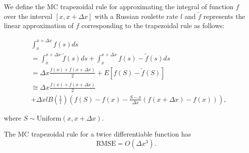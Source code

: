 \documentclass[a4paper,12pt]{article}
\begin{document}
\begin{definition}
  We define the MC trapezoidal rule for approximating the integral
  of function $f$ over the interval $[x, x+\Delta x]$ with a Russian roulette rate
  $l$ and $\tilde{f}$ represents the linear approximation of $f$ corresponding
  to the trapezoidal rule as follows:

  \begin{align}
     & \int_{x}^{x+\Delta x} f(s) ds                           \\
     & = \int_{x}^{x+\Delta x}  \tilde{f}(s) ds +
    \int_{x}^{x+\Delta x}  f(s) - \tilde{f}(s) ds              \\
     & = \Delta x \frac{f(x) + f(x+\Delta x)}{2}
    + E \left[f(S) - \tilde{f}(S)\right]                       \\
     & \cong \Delta x \frac{f(x) + f(x+\Delta x)}{2} \nonumber \\
     & + \Delta x l B\left( \frac{1}{l}\right)
    \left(f(S) - f(x) - \frac{S - x}{\Delta x}
    \left(f(x+\Delta x) - f(x)\right) \right), \label{eq:MCtrap}
  \end{align}

  where $S \sim \text{Uniform}(x,x+\Delta x)$.
\end{definition}

\begin{lemma} \label{lem:rmse mctrap}
  The MC trapezoidal rule
  for a twice differentiable function has
  \begin{equation}
    \text{RMSE} =O\left( \Delta x^{3} \right) .
  \end{equation}
\end{lemma}
\end{document}
